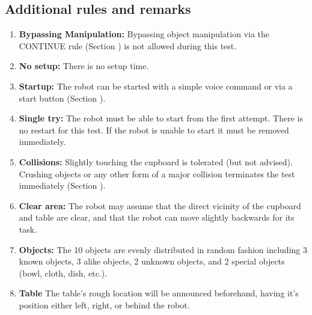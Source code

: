 \subsection{Additional rules and remarks}
\begin{enumerate}
	\item \textbf{Bypassing Manipulation:} Bypassing object manipulation via the CONTINUE rule (Section ) is not allowed during this test.
	\item \textbf{No setup:} There is no setup time.
	\item \textbf{Startup:} The robot can be started with a simple voice command or via a start button (Section ).
	\item \textbf{Single try:} The robot must be able to start from the first attempt. There is no restart for this test. If the robot is unable to start it must be removed immediately.
	\item \textbf{Collisions:} Slightly touching the cupboard is tolerated (but not advised). Crushing objects or any other form of a major collision terminates the test immediately (Section ).
	\item \textbf{Clear area:} The robot may assume that the direct vicinity of the cupboard and table are clear, and that the robot can move slightly backwards for its task.
	\item \textbf{Objects:} The 10 objects are evenly distributed in random fashion including
	3 known objects,
	3 alike objects,
	2 unknown objects, and
	2 special objects (bowl, cloth, dish, etc.).
	\item \textbf{Table} The table's rough location will be announced beforehand, having it's position either left, right, or behind the robot.
\end{enumerate}


